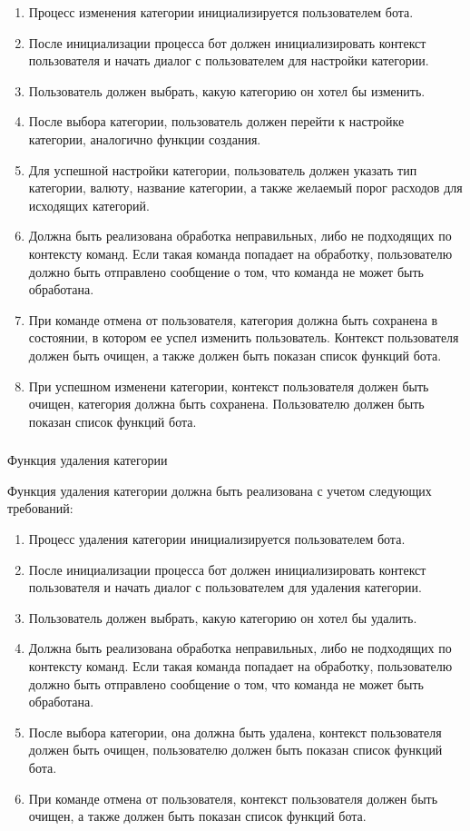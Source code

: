 \begin{enumerate}
	\item Процесс изменения категории инициализируется пользователем бота.
	\item После инициализации процесса бот должен инициализировать контекст пользователя и начать диалог с пользователем для настройки категории.
	\item Пользователь должен выбрать, какую категорию он хотел бы изменить.
	\item После выбора категории, пользователь должен перейти к настройке категории, аналогично функции создания.
	\item Для успешной настройки категории, пользователь должен указать тип категории, валюту, название категории, а также желаемый порог расходов для исходящих категорий.
	\item Должна быть реализована обработка неправильных, либо не подходящих по контексту команд. Если такая команда попадает на обработку, пользователю должно быть отправлено сообщение о том, что команда не может быть обработана.
	\item При команде отмена от пользователя, категория должна быть сохранена в состоянии, в котором ее успел изменить пользователь. Контекст пользователя должен быть очищен, а также должен быть показан список функций бота.
	\item При успешном изменени категории, контекст пользователя должен быть очищен, категория должна быть сохранена. Пользователю должен быть показан список функций бота.
\end{enumerate}

\subsubsection{} Функция удаления категории
\label{sec:domain:specification:deletecategory}

Функция удаления категории должна быть реализована с учетом следующих требований:

\begin{enumerate}
	\item Процесс удаления категории инициализируется пользователем бота.
	\item После инициализации процесса бот должен инициализировать контекст пользователя и начать диалог с пользователем для удаления категории.
	\item Пользователь должен выбрать, какую категорию он хотел бы удалить.
	\item Должна быть реализована обработка неправильных, либо не подходящих по контексту команд. Если такая команда попадает на обработку, пользователю должно быть отправлено сообщение о том, что команда не может быть обработана.
	\item После выбора категории, она должна быть удалена, контекст пользователя должен быть очищен, пользователю должен быть показан список функций бота.
	\item При команде отмена от пользователя, контекст пользователя должен быть очищен, а также должен быть показан список функций бота.
\end{enumerate}

